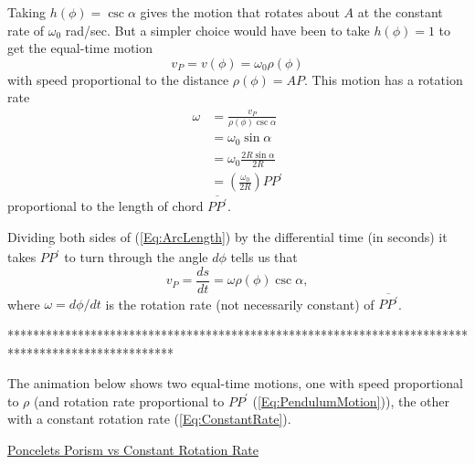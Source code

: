 \documentclass{ximera}
\begin{document}
Taking $h(\phi) = \csc \alpha$ gives the motion that rotates about $A$ at the constant rate of $\omega_0$ rad/sec. But a simpler choice would have been to take $h(\phi)=1$ to get the equal-time motion                  %
\begin{equation}
   v_P =   v(\phi) = \omega_0 \rho(\phi) \label{Eq:PendulumMotion} 
\end{equation}
with speed proportional to the distance $\rho(\phi) = AP$. This motion has a rotation rate %
\begin{align*}
     \omega &= \frac{v_P}{\rho (\phi) \csc \alpha} \\
                 &= \omega_0 \sin\alpha  \\
                  & = \omega_0 \frac{2R \sin\alpha}{2R}  \\
                  &=  \left( \frac{\omega_0}{2R}\right) PP^\prime 
\end{align*}
proportional to the length of chord $\overline{PP^\prime}$.

Dividing both sides of (\ref{Eq:ArcLength}) by the differential time (in seconds) it takes $\overline{PP^\prime}$ to turn through the angle $d\phi$ tells us that 
\begin{equation}
    v_P = \frac{ds}{dt} = \omega \rho (\phi) \csc \alpha ,  \label{Eq:ConstantRate}
\end{equation}
where $\omega  = d\phi/dt$ is the rotation rate (not necessarily constant) of $\overline{PP^\prime}$.

**************************************************************************************************
\fi


\begin{exploration}
The animation below shows two equal-time motions, one with speed proportional to $\rho$ (and rotation rate proportional to $PP^\prime$ (\ref{Eq:PendulumMotion})), the other with a constant rotation rate (\ref{Eq:ConstantRate}). 
\begin{onlineOnly}
    \begin{center}
\end{center}
\end{onlineOnly}

\href{https://www.desmos.com/calculator/xifdeg3wsq}{Poncelets Porism vs Constant Rotation Rate}

\end{exploration}
\end{document}
